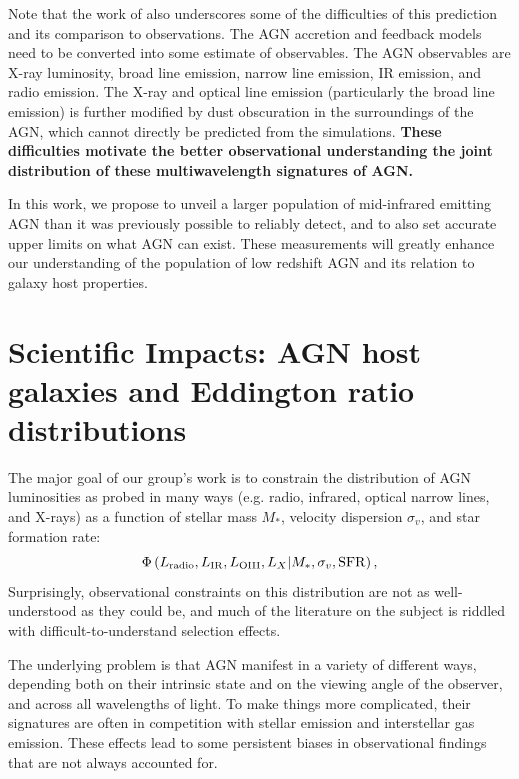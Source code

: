 \documentclass[12pt, preprint]{hacked-aastex}
\begin{document}
Note that the work of \cite{habouzit22a} also underscores some of the difficulties
of this prediction and its comparison to observations. 
The AGN accretion and feedback models need to be converted into some
estimate of observables. The AGN observables are X-ray luminosity, 
broad line emission, narrow line emission, IR emission, and radio 
emission. The X-ray and optical line emission (particularly the broad
line emission) is further modified by dust obscuration in the 
surroundings of the AGN, which cannot  directly be predicted from
the simulations. {\bf These difficulties motivate the better
observational understanding the joint distribution of these multiwavelength 
signatures of AGN.}

In this work, we propose to unveil a larger population of mid-infrared 
emitting AGN than it was previously possible to reliably detect, and 
to also set accurate upper limits on what AGN can exist. These 
measurements will greatly enhance our understanding of the population
of low redshift AGN and its relation to galaxy host properties. 

\section{Scientific Impacts: AGN host galaxies and Eddington ratio distributions}\label{sec:intro}

The major goal of our group's work is to constrain the 
distribution of AGN luminosities as probed in many ways 
(e.g. radio, infrared, optical narrow lines, and X-rays)
as a function of stellar mass $M_\ast$, velocity dispersion 
$\sigma_v$, and star formation rate:
\begin{equation}
\label{eq:model}
\Phi\left(L_{\rm radio}, L_{\rm IR}, L_{\rm OIII}, L_X | M_\ast, \sigma_v, {\rm SFR}\right),
\end{equation}
Surprisingly, observational constraints 
on this distribution are not as well-understood as they could be, and 
much of the literature on the subject is riddled with 
difficult-to-understand selection effects.

The underlying problem is that AGN
manifest in a variety of different ways, depending both
on their intrinsic state and on the viewing angle of 
the observer, and across all wavelengths of light. 
To make things more complicated, their signatures are
often in competition with stellar emission and interstellar
gas emission. These effects lead to some
persistent biases in observational findings that are
not always accounted for. 
\end{document}
